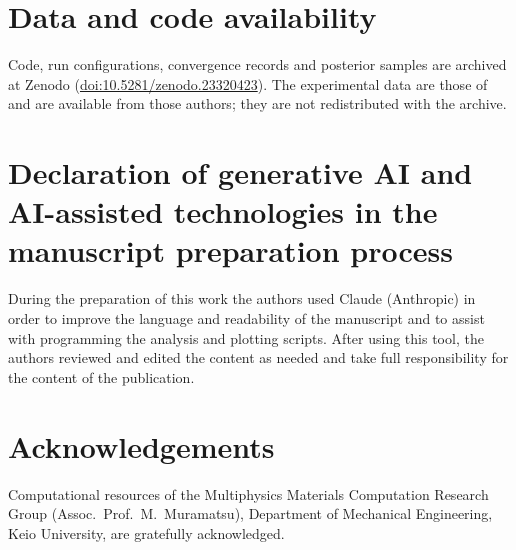 \documentclass[preprint,12pt]{elsarticle}
\begin{document}
\section*{Data and code availability}
Code, run configurations, convergence records and posterior samples are archived at Zenodo (\href{https://doi.org/10.5281/zenodo.23320423}{doi:10.5281/zenodo.23320423}). The experimental data are those of \citet{heine2025influence} and are available from those authors; they are not redistributed with the archive.

\section*{Declaration of generative AI and AI-assisted technologies in the manuscript preparation process}
During the preparation of this work the authors used Claude (Anthropic) in order to improve the language and readability of the manuscript and to assist with programming the analysis and plotting scripts. After using this tool, the authors reviewed and edited the content as needed and take full responsibility for the content of the publication.

\section*{Acknowledgements}
Computational resources of the Multiphysics Materials Computation Research Group (Assoc.\ Prof.\ M.~Muramatsu), Department of Mechanical Engineering, Keio University, are gratefully acknowledged.



\end{document}
